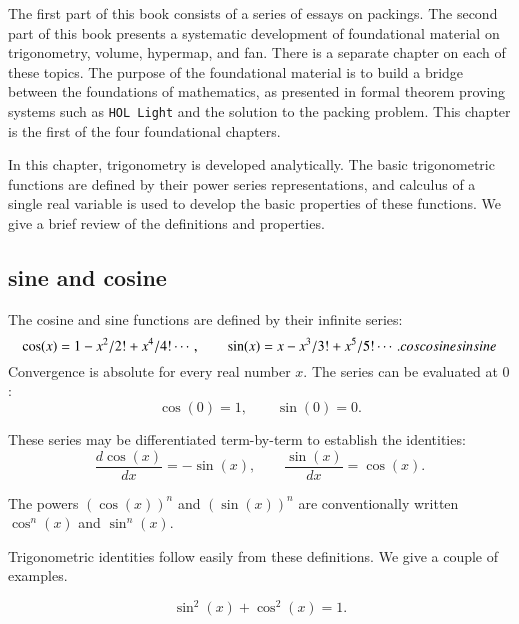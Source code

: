 

The first part of this book consists of a series of essays
on packings.  The second part of this book presents
a systematic development of foundational material on
trigonometry, volume, hypermap, and fan.  There is a separate
chapter on each of these topics.  The purpose of the
foundational material is to build a bridge between
the foundations of mathematics, as presented in formal
theorem proving systems such as {\tt HOL Light} and the
solution to the packing problem.  
This chapter is the first of the four foundational chapters.


In this chapter, trigonometry is developed analytically.  The basic
trigonometric functions are defined by their power series
representations, and calculus of a single real variable is used to
develop the basic properties of these functions.  We give a brief
review of the definitions and properties.


\subsection{sine and cosine}

The cosine and sine functions are defined by their infinite series:%
%
    \begin{equation}\label{eqn:cos-def}\cos(x) = 1 - x^2/2! + x^4/4! \cdots,\qquad
  \sin(x) = x - x^3/3! + x^5/5! \cdots.
    \index{Index}{cos}\index{Index}{cosine}\index{Index}{sin}\index{Index}{sine}
    \end{equation}
Convergence is absolute for every real number $x$.
The series can be evaluated at $0$:
    \begin{equation}\label{eqn:cos0}
    \cos(0) = 1,\qquad \sin(0) = 0.
    \end{equation}

These series may be differentiated term-by-term to establish the identities:
    \begin{equation}\label{eqn:cos'}
    \frac{d \cos(x)}{dx} = -\sin(x),\qquad \frac{ \sin(x)}{dx} = \cos(x).
    \end{equation}

The powers $(\cos(x))^n$ and $(\sin(x))^n$ are conventionally written
$\cos^n(x)$ and $\sin^n(x)$.

Trigonometric identities follow easily from these definitions.  We
give a couple of examples.

\begin{lemma}\label{lemma:circle} 
   $$\sin^2(x) + \cos^2(x) = 1.$$
\end{lemma}

